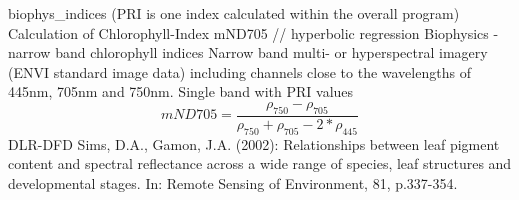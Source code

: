 %
{ %
biophys\_indices (PRI is one index calculated within the overall program)
}
%
{ %
Calculation of Chlorophyll-Index mND705 // hyperbolic regression
}
%
{ %
Biophysics - narrow band chlorophyll indices
}
%
{ %
Narrow band multi- or hyperspectral imagery (ENVI standard image data) including channels close to the wavelengths of 445nm, 705nm and 750nm.\bigskip
}
%
{ %
Single band with PRI values
}
%
{ %
\begin{displaymath}
mND705=\frac{\rho _{750} - \rho _{705}}{\rho _{750}+\rho _{705} - 2*\rho _{445}}
\end{displaymath}
}
%
{ %
DLR-DFD
}
%
{ %
Sims, D.A., Gamon, J.A. (2002): Relationships between leaf pigment content and spectral reflectance across a wide range of species, leaf structures and developmental stages. In: Remote Sensing of Environment, 81, p.337-354.
}
